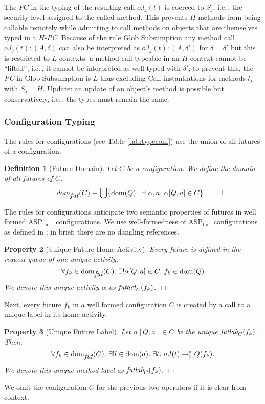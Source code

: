 \documentclass[10pt, conference, compsocconf]{IEEEtran}
\newcommand\aspfun{ASP${}_\text{fun}$\ }
\newcommand{\symb}[1]{\makebox{\it #1}}
\newcommand\dom{{\rm dom}}
\newcommand\diststar{\ensuremath{\to_\|^*}}
\newcommand\ie{i.e.\!\,, }
\newtheorem{definition}{Definition}[section]
\newtheorem{property}[definition]{Property}
\begin{document}
{The $PC$ in the typing of the resulting call $o.l_j(t)$ is coerced to $S_j$, \ie the
security level assigned to the called method. This prevents $H$ methods from being 
callable remotely while admitting to call methods on objects that are themselves typed 
in a $H$-{\it PC}.
Because of the rule {\sc Glob Subsumption} any method call $o.l_j(t): (A, \delta)$ can 
also be interpreted as $o.l_j(t): (A, \delta')$ for $\delta \sqsubseteq \delta'$ 
but this is restricted to $L$ contexts: a method call typeable in an $H$ context 
cannot be ``lifted'', 
\ie it cannot be interpreted as well-typed  with $\delta'$; to prevent this,
the {\it PC} in {\sc Glob Subsumption} is $L$ thus excluding {\sc Call} instantiations
for methods $l_j$ with $S_j = H$.
{\sc Update}: an update of an object's method is possible but conservatively, \ie the types must remain the same.

\subsubsection*{Configuration Typing}
The rules for configurations (see Table \ref{tab:typeconf}) use the union of all futures of a configuration.
\begin{definition}[Future Domain]
Let $C$ be a configuration. We define the domain of all futures of $C$.
\[\qquad dom_{\symb{fut}}(C) \equiv \bigcup \{ \dom(Q) \mid  \exists\ \alpha, a.\ \alpha[Q,a]\in C\} \qquad \Box\] 
\end{definition}

The rules for configurations anticipate two semantic properties of futures in well formed \aspfun 
configurations. We use well-formedness of \aspfun configurations as defined in \cite{hkl:11}; 
in brief: there are no dangling references. 

\begin{property}[Unique Future Home Activity]
\label{prop:futact}
Every future is defined in the request queue of one unique activity.
\[ \forall f_k \in \dom_{\symb{fut}}(C).\ \exists! \alpha[Q,a]\in C.\ f_k \in \dom(Q) \]
We denote this unique activity $\alpha$ as $\symb{futact}_C(f_k)$. \hfill$\Box$
\end{property}

Next, every future $f_k$ in a well formed configuration $C$ is created by a call to a unique label in its home activity. 
\begin{property}[Unique Future Label]
\label{prop:futlab}
Let $\alpha[Q,a]\in C$ be the unique $\symb{futlab}_C(f_k)$. Then,
\[ \forall f_k \in \dom_{\symb{fut}}(C).\ \exists! l \in \dom(a).\ \exists t.\ a.l(t) \diststar Q(f_k).\]
We denote this unique method label as $\symb{futlab}_C(f_k)$. \hfill$\Box$
\end{property}
We omit the configuration $C$ for the previous two operators if it is clear from context.

}
\end{document}
